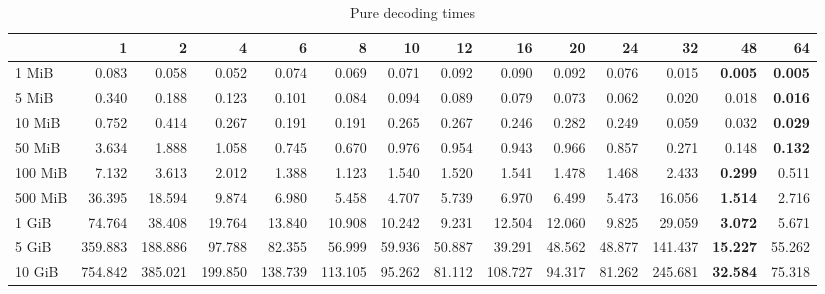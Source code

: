 \begin{centering}
\begin{table}[!h]
	\caption{Pure decoding times}
	\begin{tabular}{lrrrrrrrrrrrrr}
		\toprule
		\diagbox[width=7em]{Size}{Threads} &      1  &      2  &      4  &      6  &      8  &     10 &     12 &      16 &     20 &     24 &      32 &     48 &     64 \\
		\midrule
		1 MiB   &   0.083 &   0.058 &   0.052 &   0.074 &   0.069 &  0.071 &  0.092 &   0.090 &  0.092 &  0.076 &   0.015 &  \textbf{0.005} &  \textbf{0.005} \\
		5 MiB   &   0.340 &   0.188 &   0.123 &   0.101 &   0.084 &  0.094 &  0.089 &   0.079 &  0.073 &  0.062 &   0.020 &  0.018 &  \textbf{0.016} \\
		10 MiB  &   0.752 &   0.414 &   0.267 &   0.191 &   0.191 &  0.265 &  0.267 &   0.246 &  0.282 &  0.249 &   0.059 &  0.032 &  \textbf{0.029} \\
		50 MiB  &   3.634 &   1.888 &   1.058 &   0.745 &   0.670 &  0.976 &  0.954 &   0.943 &  0.966 &  0.857 &   0.271 &  0.148 &  \textbf{0.132} \\
		100 MiB &   7.132 &   3.613 &   2.012 &   1.388 &   1.123 &  1.540 &  1.520 &   1.541 &  1.478 &  1.468 &   2.433 &  \textbf{0.299} &  0.511 \\
		500 MiB &  36.395 &  18.594 &   9.874 &   6.980 &   5.458 &  4.707 &  5.739 &   6.970 &  6.499 &  5.473 &  16.056 &  \textbf{1.514} &  2.716 \\
		1 GiB   &  74.764 &  38.408 &  19.764 &  13.840 &  10.908 & 10.242 &  9.231 &  12.504 & 12.060 &  9.825 &  29.059 &  \textbf{3.072} &  5.671 \\
		5 GiB   & 359.883 & 188.886 &  97.788 &  82.355 &  56.999 & 59.936 & 50.887 &  39.291 & 48.562 & 48.877 & 141.437 & \textbf{15.227} & 55.262 \\
		10 GiB  & 754.842 & 385.021 & 199.850 & 138.739 & 113.105 & 95.262 & 81.112 & 108.727 & 94.317 & 81.262 & 245.681 & \textbf{32.584} & 75.318 \\
		\bottomrule
	\end{tabular}
\end{table}


\end{centering}
